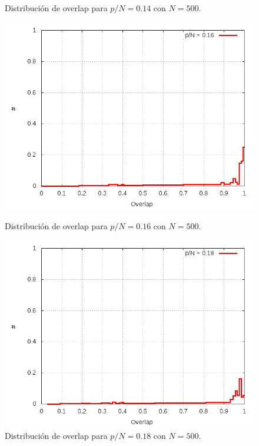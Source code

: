 \documentclass[aps,prb,onecolumn,10pt,floatfix,superscriptaddress]{article} %
\begin{document}
\begin{figure}[!htd]
\begin{minipage}[b]{0.450\linewidth}
   	     \begin{center}
  \caption{\label{Histo14} Distribuci\'on de overlap para $p/N = 0.14$ con $N=500$.}
     	    \end{center}
   \end{minipage}  
 \end{figure}

\begin{figure}[!htd] 
	\begin{minipage}[b]{0.450\linewidth}
   	    \includegraphics[scale=0.32 ]{Histo16.png}
   	    \begin{center}
  \caption{\label{Histo16} Distribuci\'on de overlap para $p/N = 0.16$ con $N=500$.}
     	    \end{center}
   \end{minipage}
   \begin{minipage}[b]{0.450\linewidth}
   	    \includegraphics[scale=0.32 ]{Histo18.png}
   	     \begin{center}
  \caption{\label{Histo18} Distribuci\'on de overlap para $p/N = 0.18$ con $N=500$.}
     	    \end{center}
   \end{minipage} 
 \end{figure}
\end{document}
